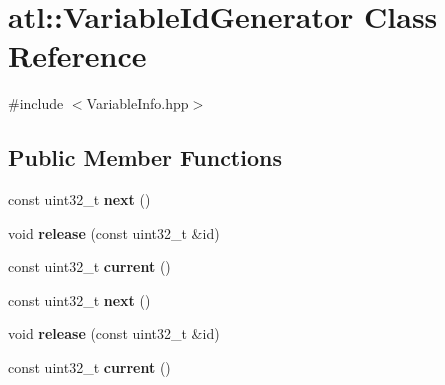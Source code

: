 \hypertarget{classatl_1_1_variable_id_generator}{\section{atl\+:\+:Variable\+Id\+Generator Class Reference}
\label{classatl_1_1_variable_id_generator}
}


{\ttfamily \#include $<$Variable\+Info.\+hpp$>$}

\subsection*{Public Member Functions}
\begin{DoxyCompactItemize}
\item 
\hypertarget{classatl_1_1_variable_id_generator_a01360832f33700e4fd86b6e237996ffd}{const uint32\+\_\+t {\bfseries next} ()}\label{classatl_1_1_variable_id_generator_a01360832f33700e4fd86b6e237996ffd}

\item 
\hypertarget{classatl_1_1_variable_id_generator_a98643dc9bff062bf39dc5de514b89e18}{void {\bfseries release} (const uint32\+\_\+t \&id)}\label{classatl_1_1_variable_id_generator_a98643dc9bff062bf39dc5de514b89e18}

\item 
\hypertarget{classatl_1_1_variable_id_generator_aa449ce6f8d2433a50fd38b8baa28e72a}{const uint32\+\_\+t {\bfseries current} ()}\label{classatl_1_1_variable_id_generator_aa449ce6f8d2433a50fd38b8baa28e72a}

\item 
\hypertarget{classatl_1_1_variable_id_generator_a01360832f33700e4fd86b6e237996ffd}{const uint32\+\_\+t {\bfseries next} ()}\label{classatl_1_1_variable_id_generator_a01360832f33700e4fd86b6e237996ffd}

\item 
\hypertarget{classatl_1_1_variable_id_generator_a98643dc9bff062bf39dc5de514b89e18}{void {\bfseries release} (const uint32\+\_\+t \&id)}\label{classatl_1_1_variable_id_generator_a98643dc9bff062bf39dc5de514b89e18}

\item 
\hypertarget{classatl_1_1_variable_id_generator_aa449ce6f8d2433a50fd38b8baa28e72a}{const uint32\+\_\+t {\bfseries current} ()}\label{classatl_1_1_variable_id_generator_aa449ce6f8d2433a50fd38b8baa28e72a}

\end{DoxyCompactItemize}
